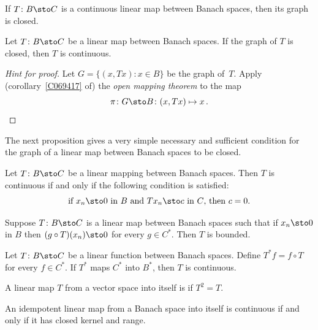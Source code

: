 \begin{exer} If $T\colon B \sto C$ is a continuous linear map between Banach spaces, then its graph is closed.
\end{exer}

\begin{thm}\label{thm_CGT} Let $T\colon B \sto C$ be a linear map between Banach
spaces.  If the graph of $T$ is closed, then $T$ is continuous.
\end{thm}

\begin{proof}[Hint for proof] Let $G = \{(x,Tx)\colon x \in B\}$ be the graph of~$T$. Apply
(corollary~\ref{C069417} of) the \emph{open mapping theorem} to the map
  \[ \pi\colon G \sto B\colon (x,Tx) \mapsto x\,. \]
\ns \end{proof}

The next proposition gives a very simple necessary and sufficient condition for the graph of a linear map between Banach
spaces to be closed.

\begin{prop}\label{prop_nasc_closed_graph} Let $T\colon B \sto C$ be a linear mapping between Banach spaces. Then $T$ is
continuous if and only if the following condition is satisfied:
   \[ \text{if $x_n \sto 0$ in $B$ and $Tx_n \sto c$ in $C$, then $c = 0$.} \]
\end{prop}

\begin{prop} Suppose $T \colon B \sto C$ is a linear map between Banach spaces such that if
$x_n \sto 0$ in $B$ then $(g \circ T)(x_n) \sto 0$ for every $g \in C^*$.  Then $T$ is
bounded.
\end{prop}

\begin{prop} Let $T \colon B \sto C$ be a linear function between Banach spaces. Define
$T^*f = f \circ T$ for every $f \in C^*$.  If $T^*$ maps $C^*$ into $B^*$, then $T$ is
continuous.
\end{prop}

\begin{defn}\label{C069624} A linear map $T$ from a vector space into itself is
 if $T^2 = T$.
\end{defn}

\begin{prop}\label{prop_cont_idem_op} An idempotent linear map from a Banach space into itself is
continuous if and only if it has closed kernel and range.
\end{prop}

